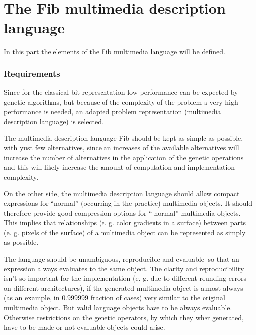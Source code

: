 %
%
%
%

\graphicspath{{./stock_language_description/}}
\graphicspath{{./stock_language_description/}{../stock_language_description}}


\newpage
\part{The Fib multimedia description language}
\label{partFibLanguage}

In this part the elements of the Fib multimedia language will be defined.


\section{Requirements}
\label{secFibLanguageRequirements}

Since for the classical bit representation low performance can be expected by genetic algorithms, but because of the complexity of the problem a very high performance is needed, an adapted problem representation (multimedia description language) is selected.

The multimedia description language Fib should be kept as simple as possible, with yust few alternatives, since an increases of the available alternatives will increase the number of alternatives in the application of the genetic operations and this will likely increase the amount of computation and implementation complexity.

On the other side, the multimedia description language should allow compact expressions for ``normal'' (occurring in the practice) multimedia objects. It should therefore provide good compression options for `` normal'' multimedia objects. This implies that relationships (e. g. color gradients in a surface) between parts (e. g. pixels of the surface) of a multimedia object can be represented as simply as possible.

The language should be unambiguous, reproducible and evaluable, so that an expression always evaluates to the same object. The clarity and reproducibility isn't so important for the implementation (e. g. due to different rounding errors on different architectures), if the generated multimedia object is almost always (as an example, in $0.999999$ fraction of cases) very similar to the original multimedia object. But valid language objects have to be always evaluable. Otherwise restrictions on the genetic operators, by which they wher generated, have to be made or not evaluable objects could arise.

